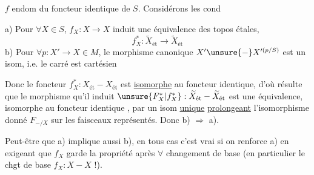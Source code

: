 $f$ endom du foncteur identique de $S$. Considérons  les cond

a) Pour $\forall X\in S$, $f_X:X\to X$ induit une équivalence des topos étales,
\[
f_X^*:\widetilde X_{\text{ét}}\longrightarrow\widetilde X_{\text{ét}}
\]
b) Pour $\forall p:X'\to X\in M$, le morphisme canonique $X'\unsure{\mathbin{-}}X'^{(p/S)}$ est un isom, i.e. le carré
est cartésien

Donc  le foncteur $f_X^*:X_{\text{ét}}\mathbin{-}X_{\text{ét}}$ est \uline{isomorphe} au foncteur identique, d'où résulte que le morphisme  qu'il induit $\unsure{F_X^*|f_X^*}:\widetilde X_{\text{ét}}\mathbin{-}\widetilde X_{\text{ét}}$ est une équivalence, isomorphe au foncteur identique , par un isom \uline{unique} \uline{prolongeant} l'isomorphisme donné $F_{-/X}$ sur les faisceaux représentés. Donc b) $\Rightarrow$ a).

Peut-être que a) implique aussi b), en tous cas c'est vrai si on renforce a) en exigeant que $f_X$ garde la propriété  après \uline{$\forall$} changement de base (en particulier le chgt de base $f_X:X\mathbin{-}X$ !).


